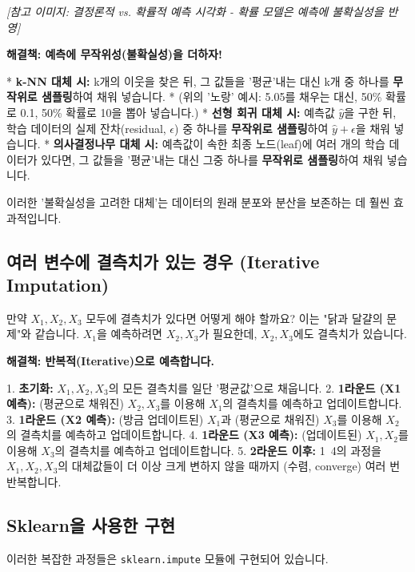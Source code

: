 \documentclass[11pt,a4paper]{book}
\theoremstyle{definition}
\begin{document}
\textit{[참고 이미지: 결정론적 vs. 확률적 예측 시각화 - 확률 모델은 예측에 불확실성을 반영]}

\textbf{해결책: 예측에 무작위성(불확실성)을 더하자!}

* \textbf{k-NN 대체 시:} k개의 이웃을 찾은 뒤, 그 값들을 '평균'내는 대신 k개 중 하나를 \textbf{무작위로 샘플링}하여 채워 넣습니다.
    * (위의 '노랑' 예시: 5.05를 채우는 대신, 50\% 확률로 0.1, 50\% 확률로 10을 뽑아 넣습니다.)
* \textbf{선형 회귀 대체 시:} 예측값 \(\hat{y}\)을 구한 뒤, 학습 데이터의 실제 잔차(residual, \(\epsilon\)) 중 하나를 \textbf{무작위로 샘플링}하여 \(\hat{y} + \epsilon\)을 채워 넣습니다.
* \textbf{의사결정나무 대체 시:} 예측값이 속한 최종 노드(leaf)에 여러 개의 학습 데이터가 있다면, 그 값들을 '평균'내는 대신 그중 하나를 \textbf{무작위로 샘플링}하여 채워 넣습니다.

이러한 '불확실성을 고려한 대체'는 데이터의 원래 분포와 분산을 보존하는 데 훨씬 효과적입니다.

\subsection{여러 변수에 결측치가 있는 경우 (Iterative Imputation)}

만약 \(X_1, X_2, X_3\) 모두에 결측치가 있다면 어떻게 해야 할까요? 이는 "닭과 달걀의 문제"와 같습니다. \(X_1\)을 예측하려면 \(X_2, X_3\)가 필요한데, \(X_2, X_3\)에도 결측치가 있습니다.

\textbf{해결책: 반복적(Iterative)으로 예측합니다.}

1.  \textbf{초기화:} \(X_1, X_2, X_3\)의 모든 결측치를 일단 '평균값'으로 채웁니다.
2.  \textbf{1라운드 (X1 예측):} (평균으로 채워진) \(X_2, X_3\)를 이용해 \(X_1\)의 결측치를 예측하고 업데이트합니다.
3.  \textbf{1라운드 (X2 예측):} (방금 업데이트된) \(X_1\)과 (평균으로 채워진) \(X_3\)를 이용해 \(X_2\)의 결측치를 예측하고 업데이트합니다.
4.  \textbf{1라운드 (X3 예측):} (업데이트된) \(X_1, X_2\)를 이용해 \(X_3\)의 결측치를 예측하고 업데이트합니다.
5.  \textbf{2라운드 이후:} 1~4의 과정을 \(X_1, X_2, X_3\)의 대체값들이 더 이상 크게 변하지 않을 때까지 (수렴, converge) 여러 번 반복합니다.

\subsection{Sklearn을 사용한 구현}

이러한 복잡한 과정들은 \texttt{sklearn.impute} 모듈에 구현되어 있습니다.
\end{document}
